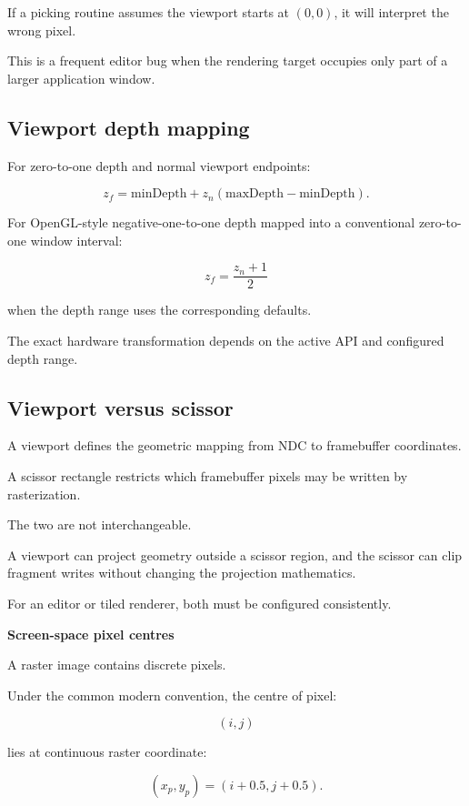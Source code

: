 If a picking routine assumes the viewport starts at \((0,0)\), it will interpret the wrong pixel.

This is a frequent editor bug when the rendering target occupies only part of a larger application window.

\subsection{Viewport depth mapping}\label{02-foundations-ii-ch033-viewport-depth-mapping}

For zero-to-one depth and normal viewport endpoints:

\[
 \boxed{ z_f=\mathrm{minDepth} + z_n(\mathrm{maxDepth}-\mathrm{minDepth}) }.
\]

For OpenGL-style negative-one-to-one depth mapped into a conventional zero-to-one window interval:

\[
 \boxed{ z_f=\frac{z_n+1}{2} }
\]

when the depth range uses the corresponding defaults.

The exact hardware transformation depends on the active API and configured depth range.

\subsection{Viewport versus scissor}\label{02-foundations-ii-ch033-viewport-versus-scissor}

A viewport defines the geometric mapping from NDC to framebuffer coordinates.

A scissor rectangle restricts which framebuffer pixels may be written by rasterization.

The two are not interchangeable.

A viewport can project geometry outside a scissor region, and the scissor can clip fragment writes without changing the projection mathematics.

For an editor or tiled renderer, both must be configured consistently.

\textbf{Screen-space pixel centres}

A raster image contains discrete pixels.

Under the common modern convention, the centre of pixel:

\[
 (i,j)
\]

lies at continuous raster coordinate:

\[
 \boxed{ (x_p,y_p)=(i+0.5,j+0.5) }.
\]

